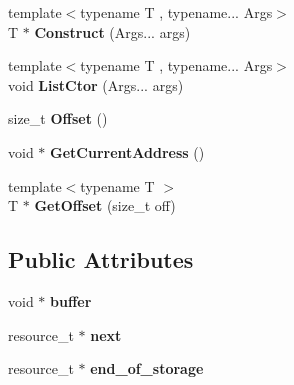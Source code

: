 \begin{DoxyCompactItemize}
{\footnotesize template$<$typename T , typename... Args$>$ }\\T $\ast$ {\bfseries Construct} (Args... args)
\item 
\mbox{\label{structnabla_1_1renderer_1_1_render_resource_a845730d3edb4873c22416001613f3414}} 
{\footnotesize template$<$typename T , typename... Args$>$ }\\void {\bfseries List\+Ctor} (Args... args)
\item 
\mbox{\label{structnabla_1_1renderer_1_1_render_resource_a54372b5c20565878b6c889b7022478e3}} 
size\+\_\+t {\bfseries Offset} ()
\item 
\mbox{\label{structnabla_1_1renderer_1_1_render_resource_a185c401ce30a0a447517de6896181fd4}} 
void $\ast$ {\bfseries Get\+Current\+Address} ()
\item 
\mbox{\label{structnabla_1_1renderer_1_1_render_resource_a7dd77e80081c6e012806e4f05c992cc5}} 
{\footnotesize template$<$typename T $>$ }\\T $\ast$ {\bfseries Get\+Offset} (size\+\_\+t off)
\end{DoxyCompactItemize}
\subsection*{Public Attributes}
\begin{DoxyCompactItemize}
\item 
\mbox{\label{structnabla_1_1renderer_1_1_render_resource_a7fc1eb4b85f84cc0821dc8408b35dd72}} 
void $\ast$ {\bfseries buffer}
\item 
\mbox{\label{structnabla_1_1renderer_1_1_render_resource_aab737ce7a097d1a8636d0c22195e2aa5}} 
resource\+\_\+t $\ast$ {\bfseries next}
\item 
\mbox{\label{structnabla_1_1renderer_1_1_render_resource_a27d2ea179a5eef59a2b3a099fb212b7a}} 
resource\+\_\+t $\ast$ {\bfseries end\+\_\+of\+\_\+storage}
\end{DoxyCompactItemize}


